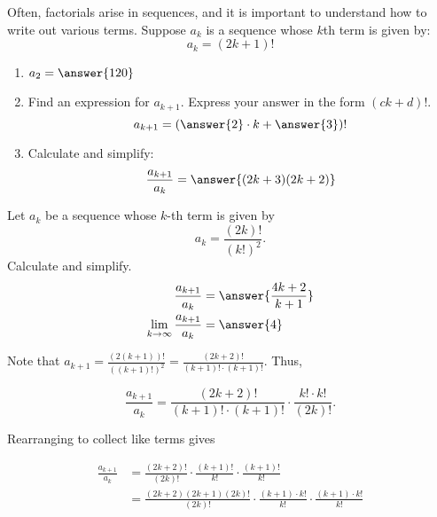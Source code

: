 \documentclass{ximera}
\begin{document}
\begin{exercise}
\begin{problem}
\begin{problem}
    
    
    
  \end{problem}
\end{problem}

\begin{problem}
  Often, factorials arise in sequences, and it is important to
  understand how to write out various terms. Suppose $a_k$ is a
  sequence whose $k$th term is given by:
  \[
  a_k = (2k+1)!
  \]
  \begin{enumerate}
  \item $a_2 = \answer{120}$
  \item Find an expression for $a_{k+1}$. Express your answer in the form $(ck+d)!$.
    \[
    a_{k+1} = \left(\answer{2} \cdot k + \answer{3}\right)!
    \]
  \item Calculate and simplify:
    \[
    \frac{a_{k+1}}{a_k} = \answer{(2k+3)(2k+2)}
    \]
  \end{enumerate}
\end{problem}

\begin{problem}
  Let $a_k$ be a sequence whose $k$-th term is given by
  \[
  a_k = \frac{(2k)!}{(k!)^2}.
  \]
  Calculate and simplify.
  \begin{align*}
    \frac{a_{k+1}}{a_k} &= \answer{\frac{4k+2}{k+1}}\\
    \lim_{k\to\infty} \frac{a_{k+1}}{a_k} &= \answer{4}
  \end{align*}
  
  \begin{hint}
  Note that $a_{k+1} = \frac{(2(k+1))!}{((k+1)!)^2} = \frac{(2k+2)!}{(k+1)! \cdot (k+1)!}$.  Thus,
  
  \[
   \frac{a_{k+1}}{a_k} = \frac{(2k+2)!}{(k+1)! \cdot (k+1)!} \cdot \frac{k! \cdot k!}{(2k)!}.
  \]
  
  Rearranging to collect like terms gives
  
  \begin{align*}
   \frac{a_{k+1}}{a_k} &= \frac{(2k+2)!}{(2k)!} \cdot \frac{(k+1)!}{k!} \cdot \frac{(k+1)!}{k!} \\
   &= \frac{(2k+2)(2k+1)(2k)!}{(2k)!} \cdot \frac{(k+1) \cdot k!}{k!} \cdot \frac{(k+1) \cdot k!}{k!}\\
  \end{align*}
  \end{hint}
\end{problem}

\end{exercise}
\end{document}
